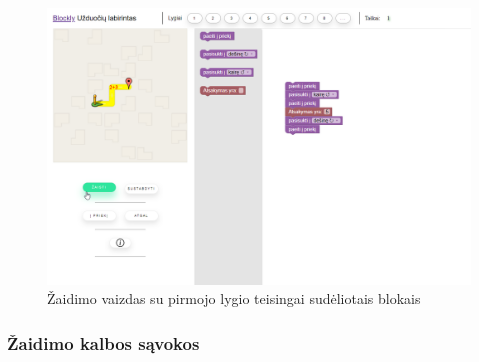 \documentclass{VUMIFPSkursinis}
\begin{document}
\begin{figure}[H]
\centering
\includegraphics[scale=0.4]{img/gameView.png}
\caption{Žaidimo vaizdas su pirmojo lygio teisingai sudėliotais blokais}
\label{img:blocklyGame}
\end{figure}

\subsubsection{Žaidimo kalbos sąvokos}
\end{document}

